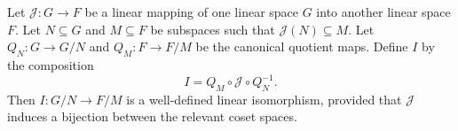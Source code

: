 Let $\mathcal{J} : G \to F$ be a linear mapping of one linear space $G$ into another linear space $F$. Let $N \subseteq G$ and $M \subseteq F$ be subspaces such that $\mathcal{J}(N) \subseteq M$. Let $Q_N : G \to G/N$ and $Q_M : F \to F/M$ be the canonical quotient maps. Define $I$ by the composition
$$
I = Q_M \circ \mathcal{J} \circ Q_N^{-1}.
$$
Then $I : G/N \to F/M$ is a well-defined linear isomorphism, provided that $\mathcal{J}$ induces a bijection between the relevant coset spaces.
